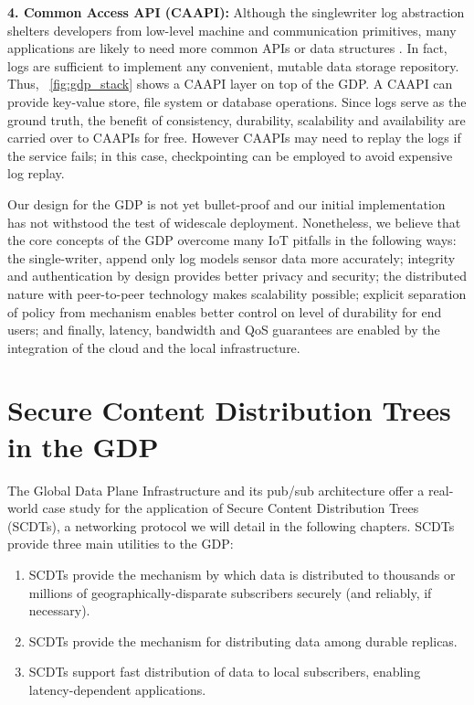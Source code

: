 \textbf{4. Common Access API (CAAPI):} Although the singlewriter
log abstraction shelters developers from low-level
machine and communication primitives, many applications
are likely to need more common APIs or data structures
\cite{tango}. In fact, logs are sufficient to implement any
convenient, mutable data storage repository. Thus, ~\autoref{fig:gdp_stack}
shows a CAAPI layer on top of the GDP. A CAAPI can
provide key-value store, file system or database operations.
Since logs serve as the ground truth, the benefit
of consistency, durability, scalability and availability are
carried over to CAAPIs for free. However CAAPIs may
need to replay the logs if the service fails; in this case,
checkpointing can be employed to avoid expensive log
replay.

Our design for the GDP is not yet bullet-proof and our
initial implementation has not withstood the test of widescale
deployment. Nonetheless, we believe that the
core concepts of the GDP overcome many IoT pitfalls in the following ways: the single-writer, append only
log models sensor data more accurately; integrity
and authentication by design provides better privacy and
security; the distributed nature with peer-to-peer technology
makes scalability possible; explicit separation of
policy from mechanism enables better control on level of
durability for end users; and finally, latency, bandwidth
and QoS guarantees are enabled by the integration of the
cloud and the local infrastructure.

\section{Secure Content Distribution Trees in the GDP}
\label{gdp-scdt}
The Global Data Plane Infrastructure and its pub/sub architecture offer a real-world case study for the application of Secure Content Distribution Trees (SCDTs), a networking protocol we will detail in the following chapters. SCDTs provide three main utilities to the GDP:

\begin{enumerate}  
	\item SCDTs provide the mechanism by which data is distributed to thousands or millions of geographically-disparate subscribers securely (and reliably, if necessary).
	\item SCDTs provide the mechanism for distributing data among durable replicas.
	\item SCDTs support fast distribution of data to local subscribers, enabling latency-dependent applications.
\end{enumerate}


